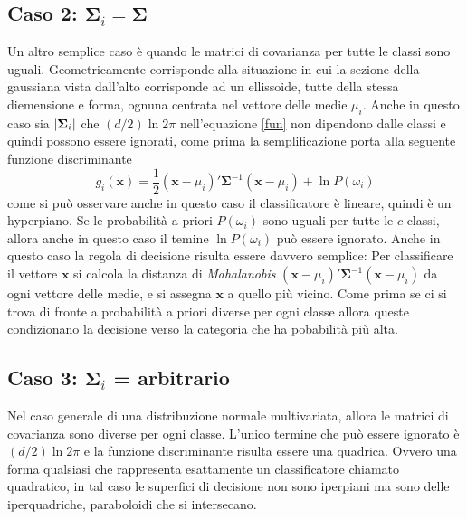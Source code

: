 \subsection{Caso 2: $\mathbf{\Sigma}_i = \mathbf{\Sigma}$}
Un altro semplice caso è quando le matrici di covarianza per tutte le classi sono uguali. Geometricamente corrisponde alla situazione in cui la sezione della gaussiana vista dall'alto corrisponde ad un ellissoide, tutte della stessa diemensione e forma, ognuna centrata nel vettore delle medie $\mu_i$. Anche in questo caso sia $\lvert\mathbf{\Sigma}_i\rvert$ che $(d/2) \ln 2\pi$ nell'equazione \ref{fun} non dipendono dalle classi e quindi possono essere ignorati, come prima la semplificazione porta alla seguente funzione discriminante
\begin{equation}
g_i(\mathbf{x})  =\frac{1}{2}(\mathbf{x} - \mu_i)' \mathbf{\Sigma}^{-1}(\mathbf{x} - \mu_i) + \ln P(\omega_i)
\end{equation}
come si può osservare anche in questo caso il classificatore è lineare, quindi è un hyperpiano.
Se le probabilità a priori $P(\omega_i)$ sono uguali per tutte le $c$ classi, allora anche in questo caso il temine $\ln P(\omega_i)$ può essere ignorato. Anche in questo caso la regola di decisione risulta essere davvero semplice: Per classificare il vettore $\mathbf{x}$ si calcola la distanza di \emph{Mahalanobis} $(\mathbf{x} - \mu_i)' \mathbf{\Sigma}^{-1}(\mathbf{x}- \mu_i)$ da ogni vettore delle medie, e si assegna $\mathbf{x}$ a quello più vicino. Come prima se ci si trova di fronte a probabilità a priori diverse per ogni classe allora queste condizionano la decisione verso la categoria che ha pobabilità più alta. 

\subsection{Caso 3: $\mathbf{\Sigma}_i$ = arbitrario}
Nel caso generale di una distribuzione normale multivariata, allora le matrici di covarianza sono diverse per ogni classe. L'unico termine che può essere ignorato è $(d/2) \ln 2\pi$ e la funzione discriminante risulta essere una quadrica. Ovvero una forma qualsiasi che rappresenta esattamente un classificatore chiamato quadratico, in tal caso le superfici di decisione non sono iperpiani ma sono delle iperquadriche, paraboloidi che si intersecano. 

